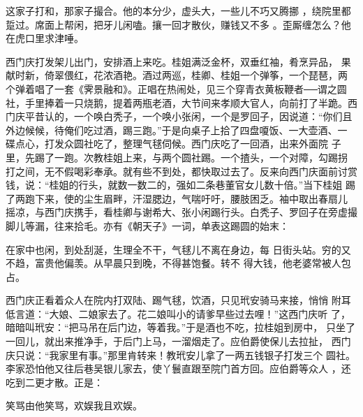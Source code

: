 这家子打和，那家子撮合。他的本分少，虚头大，一些儿不巧又腾挪
，绕院里都踅过。席面上帮闲，把牙儿闲嗑。攘一回才散伙，赚钱又不多
。歪厮缠怎么？他在虎口里求津唾。

西门庆打发架儿出门，安排酒上来吃。桂姐满泛金杯，双垂红袖，肴烹异品，
果献时新，倚翠偎红，花浓酒艳。酒过两巡，桂卿、桂姐一个弹筝，一个琵琶，两
个弹着唱了一套《霁景融和》。正唱在热闹处，见三个穿青衣黄板鞭者──谓之圆
社，手里捧着一只烧鹅，提着两瓶老酒，大节间来孝顺大官人，向前打了半跪。西
门庆平昔认的，一个唤白秃子，一个唤小张闲，一个是罗回子，因说道：“你们且
外边候候，待俺们吃过酒，踢三跑。”于是向桌子上拾了四盘嗄饭、一大壶酒、一
碟点心，打发众圆社吃了，整理气毬伺候。西门庆吃了一回酒，出来外面院
子里，先踢了一跑。次教桂姐上来，与两个圆社踢。一个揸头，一个对障，勾踢拐
打之间，无不假喝彩奉承。就有些不到处，都快取过去了。反来向西门庆面前讨赏
钱，说：“桂姐的行头，就数一数二的，强如二条巷董官女儿数十倍。”当下桂姐
踢了两跑下来，使的尘生眉畔，汗湿腮边，气喘吁吁，腰肢困乏。袖中取出春扇儿
摇凉，与西门庆携手，看桂卿与谢希大、张小闲踢行头。白秃子、罗回子在旁虚撮
脚儿等漏，往来拾毛。亦有《朝天子》一词，单表这踢圆的始末：

在家中也闲，到处刮涎，生理全不干，气毬儿不离在身边，每
日街头站。穷的又不趋，富贵他偏羡。从早晨只到晚，不得甚饱餐。转不
得大钱，他老婆常被人包占。

西门庆正看着众人在院内打双陆、踢气毬，饮酒，只见玳安骑马来接，悄悄
附耳低言道：“大娘、二娘家去了。花二娘叫小的请爹早些过去哩！”这西门庆听
了，暗暗叫玳安：“把马吊在后门边，等着我。”于是酒也不吃，拉桂姐到房中，
只坐了一回儿，就出来推净手，于后门上马，一溜烟走了。应伯爵使保儿去拉扯，
西门庆只说：“我家里有事。”那里肯转来！教玳安儿拿了一两五钱银子打发三个
圆社。李家恐怕他又往后巷吴银儿家去，使丫鬟直跟至院门首方回。应伯爵等众人
，还吃到二更才散。正是：

笑骂由他笑骂，欢娱我且欢娱。